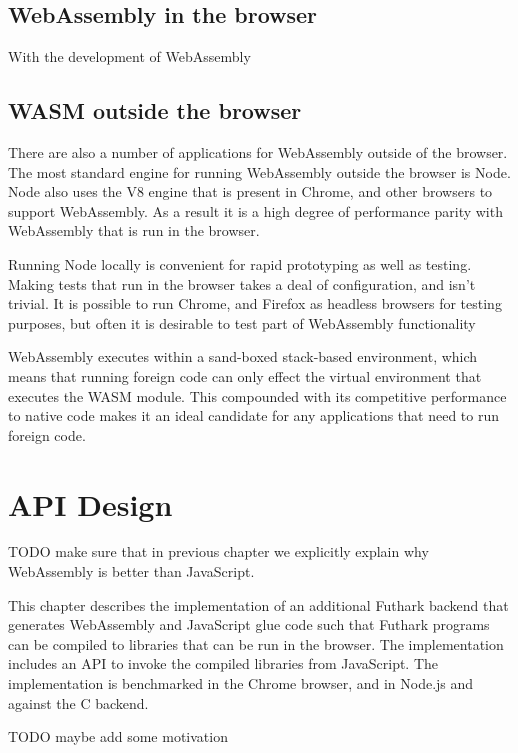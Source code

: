 \documentclass[11pt]{book}
\begin{document}
\section{WebAssembly in the browser}

With the development of WebAssembly


\section{WASM outside the browser}

There are also a number of applications for WebAssembly outside of the browser. The most standard engine for running WebAssembly outside the browser is Node. Node also uses the V8 engine that is present in Chrome, and other browsers to support WebAssembly. As a result it is a high degree of performance parity with WebAssembly that is run in the browser.

Running Node locally is convenient for rapid prototyping as well as testing. Making tests that run in the browser takes a deal of configuration, and isn't trivial. It is possible to run Chrome, and Firefox as headless browsers for testing purposes, but often it is desirable to test part of WebAssembly functionality


WebAssembly executes within a sand-boxed stack-based environment, which means that running foreign code can only effect the virtual environment that executes the WASM module. This compounded with its competitive performance to native code makes it an ideal candidate for any applications that need to run foreign code. 




\chapter{API Design}

TODO make sure that in previous chapter we explicitly explain why WebAssembly is better than JavaScript. 



This chapter describes the implementation of an additional Futhark backend that generates WebAssembly and JavaScript glue code such that Futhark programs can be compiled to libraries that can be run in the browser. The implementation includes an API to invoke the compiled libraries from JavaScript. The implementation is benchmarked in the Chrome browser, and in Node.js and against the C backend.

TODO maybe add some motivation
\end{document}
